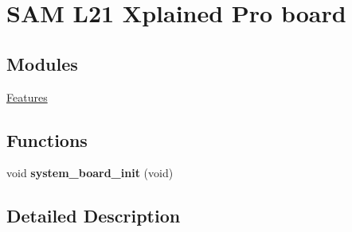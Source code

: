 \hypertarget{group__saml21__xplained__pro__group}{}\section{S\+A\+M L21 Xplained Pro board}
\label{group__saml21__xplained__pro__group}
\subsection*{Modules}
\begin{DoxyCompactItemize}
\item 
\hyperlink{group__saml21__xplained__pro__features__group}{Features}
\end{DoxyCompactItemize}
\subsection*{Functions}
\begin{DoxyCompactItemize}
\item 
\hypertarget{group__saml21__xplained__pro__group_gae25f520a05ec8f10b092636516e63c0e}{}void {\bfseries system\+\_\+board\+\_\+init} (void)\label{group__saml21__xplained__pro__group_gae25f520a05ec8f10b092636516e63c0e}

\end{DoxyCompactItemize}


\subsection{Detailed Description}
